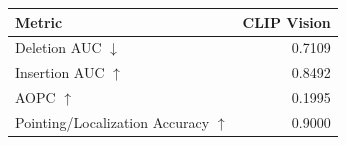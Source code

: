 \begin{tabular}{lr}
\hline
Metric & CLIP Vision \\
\hline
Deletion AUC $\downarrow$ & 0.7109 \\
Insertion AUC $\uparrow$ & 0.8492 \\
AOPC $\uparrow$ & 0.1995 \\
Pointing/Localization Accuracy $\uparrow$ & 0.9000 \\
\hline
\end{tabular}
